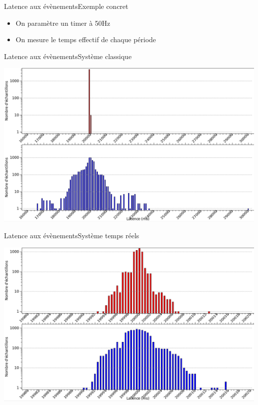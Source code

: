 \begin{frame}{Latence aux évènements}{Exemple concret}
  \begin{itemize}
  \item On paramètre un timer à 50Hz
  \item On mesure le temps effectif de chaque période
  \end{itemize}
\end{frame}

\begin{frame}{Latence aux évènements}{Système classique}
  \begin{center}
    \includegraphics[width=\textwidth]{pics/latencyNorm}
  \end{center}
\end{frame}

\begin{frame}{Latence aux évènements}{Système temps réels}
  \begin{center}
    \includegraphics[width=\textwidth]{pics/latencyRT}
  \end{center}
\end{frame}

